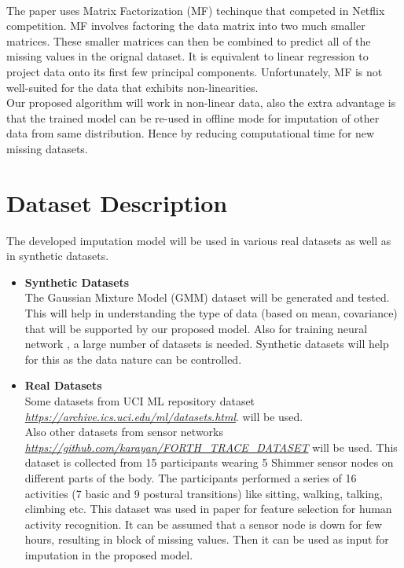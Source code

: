 \\ 
The paper \cite{koren_netflix} uses Matrix Factorization (MF) techinque that competed in Netflix competition. MF involves factoring the data matrix into two much smaller matrices. These smaller matrices can then be combined to predict all of the missing values in the orignal dataset. It is equivalent to linear regression to project data onto its first few principal components. Unfortunately, MF is not well-suited for the data that exhibits non-linearities.
\\ Our proposed algorithm will work in non-linear data, also the extra advantage is that the trained model can be re-used in offline mode for imputation of other data from same distribution. Hence by reducing computational time for new missing datasets.
\section{Dataset Description}
The developed imputation model will be used in various real datasets as well as in synthetic datasets.
\begin{itemize}
\item \textbf{ Synthetic Datasets }
\\
The Gaussian Mixture Model (GMM) dataset will be generated and tested. This will help in understanding the type of data (based on mean, covariance) that will be supported by our proposed model. Also for training neural network , a large number of datasets is needed. Synthetic datasets will help for this as the data nature can be controlled.
\item \textbf { Real Datasets }
\\ 
Some datasets from UCI ML repository dataset \href{https://archive.ics.uci.edu/ml/datasets.html}{\textit{https://archive.ics.uci.edu/ml/datasets.html}}.
 will be used. 
 \\ Also other datasets from sensor networks \\ \href{https://github.com/karayan/FORTH_TRACE_DATASET}{\textit{https://github.com/karayan/FORTH\_TRACE\_DATASET}} will be used. This dataset is collected from 15 participants wearing 5 Shimmer sensor nodes on different parts of the body. The participants performed a series of 16 activities (7 basic and 9 postural transitions) like sitting, walking, talking, climbing etc. This dataset was used in \cite{Katerina_acm} paper for feature selection for human activity recognition. It can be assumed that a sensor node is down for few hours, resulting in block of missing values. Then it can be used as input for imputation in the proposed model.
  
\end{itemize}


